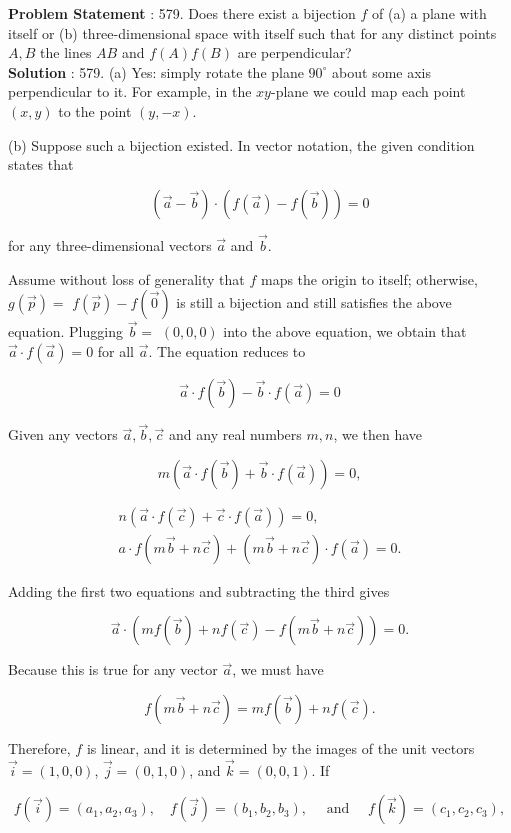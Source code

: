\documentclass[10pt]{article}
\begin{document}
\textbf{Problem Statement} :
579. Does there exist a bijection $f$ of (a) a plane with itself or (b) three-dimensional space with itself such that for any distinct points $A, B$ the lines $A B$ and $f(A) f(B)$ are perpendicular?
\\
\textbf{Solution} :
579. (a) Yes: simply rotate the plane $90^{\circ}$ about some axis perpendicular to it. For example, in the $x y$-plane we could map each point $(x, y)$ to the point $(y,-x)$.

(b) Suppose such a bijection existed. In vector notation, the given condition states that

$$
(\vec{a}-\vec{b}) \cdot(f(\vec{a})-f(\vec{b}))=0
$$

for any three-dimensional vectors $\vec{a}$ and $\vec{b}$.

Assume without loss of generality that $f$ maps the origin to itself; otherwise, $g(\vec{p})=$ $f(\vec{p})-f(\overrightarrow{0})$ is still a bijection and still satisfies the above equation. Plugging $\vec{b}=$ $(0,0,0)$ into the above equation, we obtain that $\vec{a} \cdot f(\vec{a})=0$ for all $\vec{a}$. The equation reduces to

$$
\vec{a} \cdot f(\vec{b})-\vec{b} \cdot f(\vec{a})=0
$$

Given any vectors $\vec{a}, \vec{b}, \vec{c}$ and any real numbers $m, n$, we then have

$$
m(\vec{a} \cdot f(\vec{b})+\vec{b} \cdot f(\vec{a}))=0,
$$



$$
\begin{array}{r}
n(\vec{a} \cdot f(\vec{c})+\vec{c} \cdot f(\vec{a}))=0, \\
a \cdot f(m \vec{b}+n \vec{c})+(m \vec{b}+n \vec{c}) \cdot f(\vec{a})=0 .
\end{array}
$$

Adding the first two equations and subtracting the third gives

$$
\vec{a} \cdot(m f(\vec{b})+n f(\vec{c})-f(m \vec{b}+n \vec{c}))=0 .
$$

Because this is true for any vector $\vec{a}$, we must have

$$
f(m \vec{b}+n \vec{c})=m f(\vec{b})+n f(\vec{c}) .
$$

Therefore, $f$ is linear, and it is determined by the images of the unit vectors $\vec{i}=(1,0,0)$, $\vec{j}=(0,1,0)$, and $\vec{k}=(0,0,1)$. If

$$
f(\vec{i})=\left(a_{1}, a_{2}, a_{3}\right), \quad f(\vec{j})=\left(b_{1}, b_{2}, b_{3}\right), \quad \text { and } \quad f(\vec{k})=\left(c_{1}, c_{2}, c_{3}\right),
$$
\end{document}
